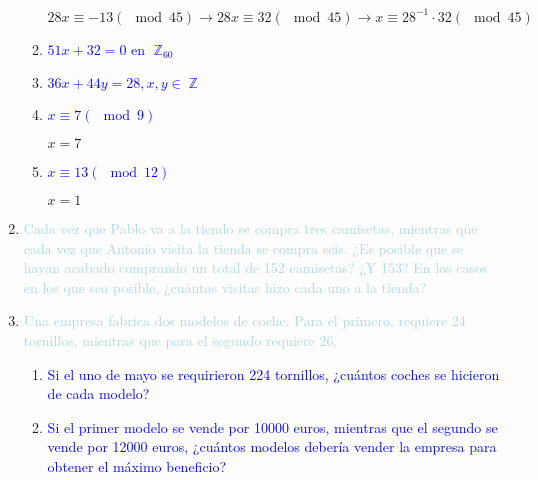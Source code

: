 \documentclass[12pt]{article}
\newcommand{\lb}[1]{\textcolor{lightblue}{#1}}
\newcommand{\db}[1]{\textcolor{blue}{#1}}
\DeclareMathOperator{\Z}{\mathbb{Z}}
\begin{document}
\begin{enumerate}[label=\color{red}\textbf{\arabic*)}, leftmargin=*]
\begin{enumerate}[label=\color{red}\alph*)]
		$28x\equiv-13(\mod45)\longrightarrow28x\equiv32(\mod45)\longrightarrow x\equiv28^{-1}\cdot32(\mod45)$
		\item \db{$51x+32=0$ en $\Z_{60}$}
		\item \db{$36x+44y=28, x,y\in \Z$}
		\item \db{$x\equiv7(\mod9)$}
		
		$x=7$
		\item \db{$x\equiv13(\mod12)$}
		
		$x=1$
	\end{enumerate}
	\item \lb{Cada vez que Pablo va a la tiendo se compra tres camisetas, mientras que cada vez que Antonio visita la tienda se compra seis. ¿Es posible que se hayan acabado comprando un total de 152 camisetas? ¿Y 153? En los casos en los que sea posible, ¿cuántas visitas hizo cada uno a la tienda?}
	\item \lb{Una empresa fabrica dos modelos de coche. Para el primero, requiere 24 tornillos, mientras que para el segundo requiere 26.}
	\begin{enumerate}[label=\color{red}\alph*)]
		\item \db{Si el uno de mayo se requirieron 224 tornillos, ¿cuántos coches se hicieron de cada modelo?}
		\item \db{Si el primer modelo se vende por 10000 euros, mientras que el segundo se vende por 12000 euros, ¿cuántos modelos debería vender la empresa para obtener el máximo beneficio?}
	\end{enumerate}
\end{enumerate}
\end{document}
